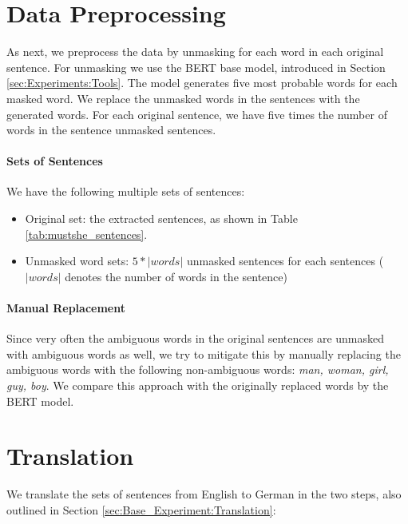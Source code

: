 \section{Data Preprocessing}
\label{sec:Real_Experiment:Preprocessing}

As next, we preprocess the data by unmasking for each word in each original sentence. For unmasking we use the BERT base model, introduced in Section \ref{sec:Experiments:Tools}. The model generates five most probable words for each masked word. We replace the unmasked words in the sentences with the generated words. For each original sentence, we have five times the number of words in the sentence unmasked sentences.

\paragraph{Sets of Sentences} We have the following multiple sets of sentences:
\begin{itemize}
    \item Original set: the extracted sentences, as shown in Table \ref{tab:mustshe_sentences}. 
    \item Unmasked word sets: $5*|words|$ unmasked sentences for each sentences ($|words|$ denotes the number of words in the sentence)
\end{itemize}

\paragraph{Manual Replacement} Since very often the ambiguous words in the original sentences are unmasked with ambiguous words as well, we try to mitigate this by manually replacing the ambiguous words with the following non-ambiguous words: \textit{man, woman, girl, guy, boy}. We compare this approach with the originally replaced words by the BERT model.


\section{Translation}
\label{sec:Real_Experiment:Translation}

We translate the sets of sentences from English to German in the two steps, also outlined in Section \ref{sec:Base_Experiment:Translation}:

